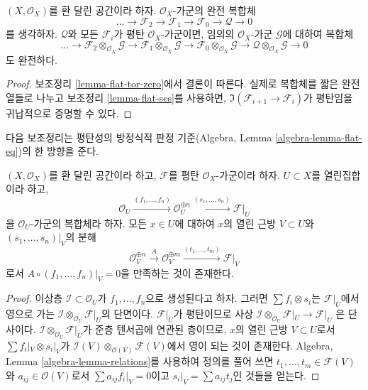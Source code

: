 \begin{lemma}
\label{lemma-flat-resolution-of-flat}
$(X, \mathcal{O}_X)$를 환 달린 공간이라 하자.
$\mathcal{O}_X$-가군의 완전 복합체
$$
\ldots \to
\mathcal{F}_2 \to
\mathcal{F}_1 \to
\mathcal{F}_0 \to
\mathcal{Q} \to 0
$$
를 생각하자. $\mathcal{Q}$와 모든 $\mathcal{F}_i$가 평탄
$\mathcal{O}_X$-가군이면, 임의의 $\mathcal{O}_X$-가군
$\mathcal{G}$에 대하여 복합체
$$
\ldots \to
\mathcal{F}_2 \otimes_{\mathcal{O}_X} \mathcal{G} \to
\mathcal{F}_1 \otimes_{\mathcal{O}_X} \mathcal{G} \to
\mathcal{F}_0 \otimes_{\mathcal{O}_X} \mathcal{G} \to
\mathcal{Q} \otimes_{\mathcal{O}_X} \mathcal{G} \to 0
$$
도 완전하다.
\end{lemma}

\begin{proof}
보조정리 \ref{lemma-flat-tor-zero}에서 결론이 따른다. 실제로 복합체를
짧은 완전열들로 나누고 보조정리 \ref{lemma-flat-ses}를 사용하면,
$\Im(\mathcal{F}_{i + 1} \to \mathcal{F}_i)$가 평탄임을 귀납적으로 증명할 수 있다.
\end{proof}

\noindent
다음 보조정리는 평탄성의 방정식적 판정 기준(Algebra, Lemma
\ref{algebra-lemma-flat-eq})의 한 방향을 준다.

\begin{lemma}
\label{lemma-flat-eq}
$(X, \mathcal{O}_X)$를 환 달린 공간이라 하고, $\mathcal{F}$를 평탄
$\mathcal{O}_X$-가군이라 하자. $U \subset X$를 열린집합이라 하고,
$$
\mathcal{O}_U \xrightarrow{(f_1, \ldots, f_n)}
\mathcal{O}_U^{\oplus n} \xrightarrow{(s_1, \ldots, s_n)}
\mathcal{F}|_U
$$
을 $\mathcal{O}_U$-가군의 복합체라 하자. 모든 $x \in U$에 대하여
$x$의 열린 근방 $V \subset U$와 $(s_1, \ldots, s_n)|_V$의 분해
$$
\mathcal{O}_V^{\oplus n}
\xrightarrow{A}
\mathcal{O}_V^{\oplus m} \xrightarrow{(t_1, \ldots, t_m)}
\mathcal{F}|_V
$$
로서 $A \circ (f_1, \ldots, f_n)|_V = 0$을 만족하는 것이 존재한다.
\end{lemma}

\begin{proof}
이상층 $\mathcal{I} \subset \mathcal{O}_U$가
$f_1, \ldots, f_n$으로 생성된다고 하자. 그러면
$\sum f_i \otimes s_i$는 $\mathcal{F}|_U$에서 영으로 가는
$\mathcal{I} \otimes_{\mathcal{O}_U} \mathcal{F}|_U$의 단면이다.
$\mathcal{F}|_U$가 평탄이므로 사상
$\mathcal{I} \otimes_{\mathcal{O}_U} \mathcal{F}|_U \to \mathcal{F}|_U$
은 단사이다. $\mathcal{I} \otimes_{\mathcal{O}_U} \mathcal{F}|_U$가
준층 텐서곱에 연관된 층이므로, $x$의 열린 근방 $V \subset U$로서
$\sum f_i|_V \otimes s_i|_V$가
$\mathcal{I}(V) \otimes_{\mathcal{O}(V)} \mathcal{F}(V)$에서 영이 되는
것이 존재한다. Algebra, Lemma \ref{algebra-lemma-relations}를 사용하여
정의를 풀어 쓰면 $t_1, \ldots, t_m \in \mathcal{F}(V)$와
$a_{ij} \in \mathcal{O}(V)$로서 $\sum a_{ij}f_i|_V = 0$이고
$s_i|_V = \sum a_{ij}t_j$인 것들을 얻는다.
\end{proof}














